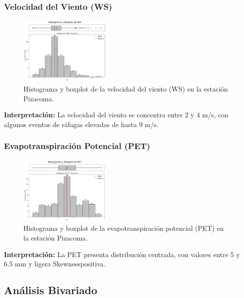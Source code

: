 \subsubsection*{Velocidad del Viento (WS)}
\begin{figure}[H]
\centering
\includegraphics[width=0.4\textwidth]{resultados/por_estacion_meteorologica/Pizacoma/WS_histograma.png}
\caption{Histograma y boxplot de la velocidad del viento (WS) en la estación Pizacoma.}
\label{fig:pizacoma_WS}
\end{figure}
\textbf{Interpretación:} La velocidad del viento se concentra entre 2 y 4 m/s, con algunos eventos de ráfagas elevadas de hasta 9 m/s.

\subsubsection*{Evapotranspiración Potencial (PET)}
\begin{figure}[H]
\centering
\includegraphics[width=0.4\textwidth]{resultados/por_estacion_meteorologica/Pizacoma/PET_histograma.png}
\caption{Histograma y boxplot de la evapotranspiración potencial (PET) en la estación Pizacoma.}
\label{fig:pizacoma_PET}
\end{figure}
\textbf{Interpretación:} La PET presenta distribución centrada, con valores entre 5 y 6.5 mm y ligera Skewnesspositiva.

\subsection{Análisis Bivariado}

